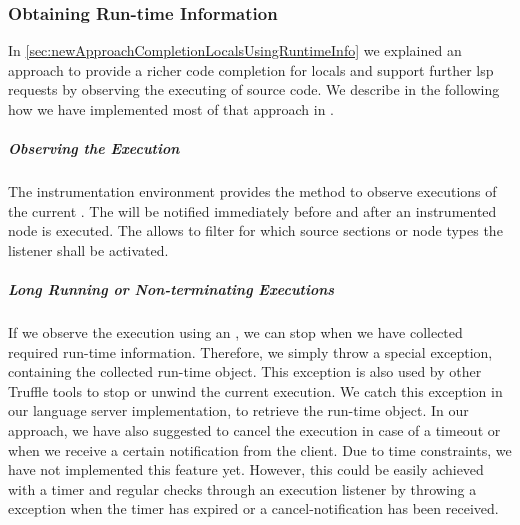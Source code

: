 \subsubsection{Obtaining Run-time Information}
\label{sec:impl:obtainingRunTimeInfos}

    In \autoref{sec:newApproachCompletionLocalsUsingRuntimeInfo} we explained an approach to provide a richer code completion for locals and support further \ac{lsp} requests by observing the executing of source code. We describe in the following how we have implemented most of that approach in \graallsp.

    \subparagraph{Observing the Execution}
    The instrumentation environment provides the method  to observe executions of the current . The  will be notified immediately before and after an instrumented node is executed. The  allows to filter for which source sections or node types the listener shall be activated.

    \subparagraph{Long Running or Non-terminating Executions}
    If we observe the execution using an , we can stop when we have collected required run-time information. Therefore, we simply throw a special  exception, containing the collected run-time object. This exception is also used by other Truffle tools to stop or unwind the current execution. We catch this exception in our language server implementation, to retrieve the run-time object. In our approach, we have also suggested to cancel the execution in case of a timeout or when we receive a certain notification from the client. Due to time constraints, we have not implemented this feature yet. However, this could be easily achieved with a timer and regular checks through an execution listener by throwing a  exception when the timer has expired or a cancel-notification has been received.

